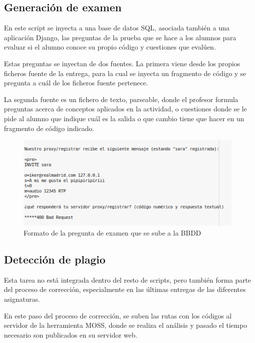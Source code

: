 \subsection{Generación de examen}
\label{sec:gen_exam}

En este script se inyecta a una base de datos SQL, asociada también a una aplicación Django, las preguntas de la prueba que se hace a los alumnos para evaluar si el alumno conoce su propio código y cuestiones que evalúen.


Estas preguntas se inyectan de dos fuentes. La primera viene desde los propios ficheros fuente de la entrega, para la cual se inyecta un fragmento de código y se pregunta a cuál de los ficheros fuente pertenece.


La segunda fuente es un fichero de texto, parseable, donde el profesor formula preguntas acerca de conceptos aplicados en la actividad, o cuestiones donde se le pide al alumno que indique cuál es la salida o que cambio tiene que hacer en un fragmento de código indicado.

\begin{figure}[H]
   \centering
   \includegraphics[width=16cm]{img/Selection_020_expregunta}
   \caption{Formato de la pregunta de examen que se sube a la BBDD}
   \label{figura:formato_examen}
\end{figure}

\subsection{Detección de plagio}
\label{sec:detec_plagio}

Esta tarea no está integrada dentro del resto de scripts, pero también forma parte del proceso de corrección, especialmente en las últimas entregas de las diferentes asignaturas.

En este paso del proceso de corrección, se suben las rutas con los códigos al servidor de la herramienta MOSS, donde se realiza el análisis y pasado el tiempo necesario son publicados en su servidor web.


